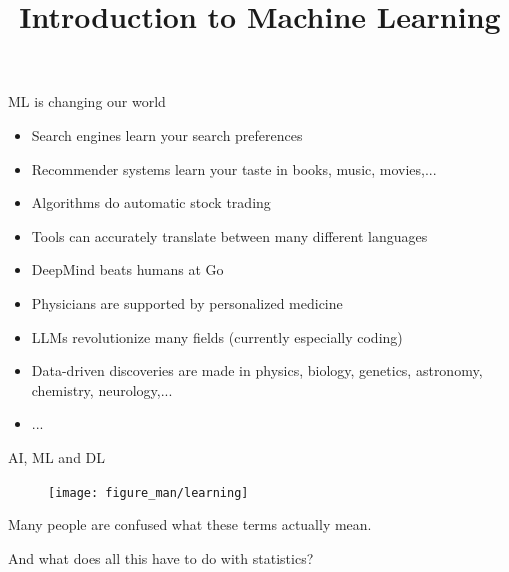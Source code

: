 \documentclass[11pt,compress,t,notes=noshow, xcolor=table]{beamer}
\title{Introduction to Machine Learning}
\begin{document}


\begin{frame}{ML is changing our world}

\begin{itemize}

  \item Search engines learn your search preferences
  
  \item Recommender systems learn your taste in books, music, movies,...
  
  \item Algorithms do automatic stock trading
 

  \item Tools can accurately translate between many different languages
    
  \item DeepMind beats humans at Go
  
  \item Physicians are supported by personalized medicine

  \item LLMs revolutionize many fields (currently especially coding)
  
  \item Data-driven discoveries are made in physics, biology, genetics, 
  astronomy, chemistry, neurology,...
  
  \item ...
  
\end{itemize}

\end{frame}


\begin{frame}{AI, ML and DL}

\begin{center}

  \begin{figure}
    \texttt{[image: figure\_man/learning]} 
  \end{figure}
  \end{center}
  \lz

Many people are confused what these terms actually mean. 

\lz

And what does all this have to do with statistics?

  
\end{frame}
\end{document}
